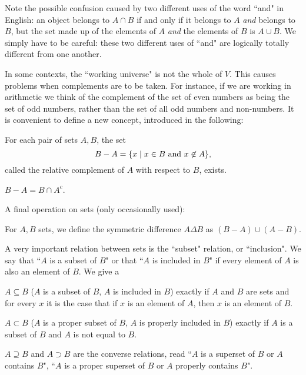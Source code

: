 Note the possible confusion caused by two different uses of
the word ``and" in English: an object belongs to $A \cap B$ if and
only if it belongs to $A$ {\itshape and\/} belongs to $B$, but the set made
up of the elements of $A$ {\itshape and\/} the elements of $B$ is $A \cup
B$.  We simply have to be careful: these two different uses of ``and"
are logically totally different from one another.

In some contexts, the ``working universe" is not
the whole of $V$.  This causes problems when complements are
to be taken.  For instance, if we are working in arithmetic we think of the
complement of the set of even numbers as being the set of odd numbers, rather
than the set of all odd numbers and non-numbers.  It is convenient to
define a new concept, introduced in the following:

\begin{thm}
 For each pair of sets $A, B$, the set
 $$
  B - A = \{x \mid \mbox{$x \in B$ and $x \not\in A$}\},
 $$
 called the {\upshape relative
 complement of $A$ with respect to $B$\/}, exists.
\end{thm}

\preuve $B - A = B \cap A^c$.\finpreuve

A final operation on sets (only occasionally used):

\begin{definition}
For $A,B$ sets, we define the {\upshape symmetric difference\/} $A \Delta B$ as $(B - A) \cup (A - B)$.
\end{definition}


A very important relation between sets is the ``subset"
relation, or ``inclusion".  We say that ``$A$ is
a subset of $B$" or that ``$A$ is included in $B$" if every element of $A$ is
also an element of $B$.  We give a

\begin{definition}
 $A \subseteq B$ ($A$ is a {\upshape subset} of $B$, $A$ is {\upshape included}
 in $B$) exactly if
 $A$ and $B$ are sets and for every $x$ it is the case that if $x$ is an
 element of $A$, then $x$ is an element of $B$.

 $A \subset B$ ($A$ is a {\upshape proper subset}
 of $B$, $A$ is properly included in $B$) exactly if $A$ is a subset of $B$ and
 $A$ is not equal to $B$.

 $A \supseteq B$ and $A \supset B$ are the
 converse relations, read ``$A$ is a superset
 of $B$ or $A$ contains $B$", ``$A$ is a proper superset of $B$
 or $A$ properly contains $B$".
\end{definition}


